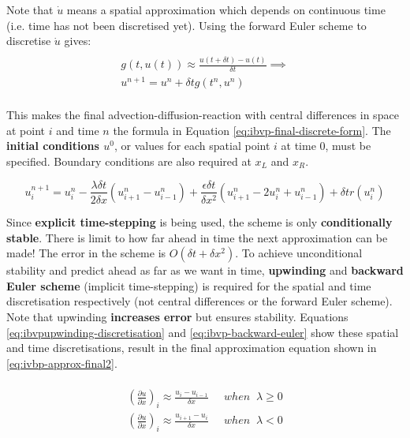 \documentclass{article}
\begin{document}
Note that $\dot{u}$ means a spatial approximation which depends on continuous time (i.e. time has not been discretised yet). Using the forward Euler scheme to discretise $\dot{u}$ gives:
\begin{multline}\\
	g(t, u(t)) \approx \frac{u(t + \delta t) - u(t)}{\delta t} \implies \\
	u^{n+1} = u^n + \delta t g(t^n, u^n) \\
\end{multline}

This makes the final advection-diffusion-reaction with central differences in space at point $i$ and time $n$ the formula in Equation \ref{eq:ibvp-final-discrete-form}. The \textbf{initial conditions $u^0$}, or values for each spatial point $i$ at time $0$, must be specified. Boundary conditions are also required at $x_L$ and $x_R$.

\begin{equation}
	u_i^{n+1} = u_i^n - \frac{\lambda \delta t}{2 \delta x}(u_{i+1}^n - u_{i-1}^n) + \frac{\epsilon \delta t}{\delta x^2}(u_{i+1}^n - 2u_i^n + u_{i-1}^n) + \delta tr(u_i^n)
	\label{eq:ibvp-final-discrete-form}
\end{equation}

Since \textbf{explicit time-stepping} is being used, the scheme is only \textbf{conditionally stable}. There is limit to how far ahead in time the next approximation can be made! The error in the scheme is $O(\delta t + \delta x^2)$. To achieve unconditional stability and predict ahead as far as we want in time, \textbf{upwinding} and \textbf{backward Euler scheme} (implicit time-stepping) is required for the spatial and time discretisation respectively (not central differences or the forward Euler scheme). Note that upwinding \textbf{increases error} but ensures stability. Equations \ref{eq:ibvpupwinding-discretisation} and \ref{eq:ibvp-backward-euler} show these spatial and time discretisations, result in the final approximation equation shown in \ref{eq:ivbp-approx-final2}.

\begin{multline}\\
	{\left( \frac{\partial u}{\partial x} \right)}_i \approx \frac{u_i - u_{i - 1}}{\delta x} \;\;\;\;\; when \;\; \lambda \geq 0 \\
	{\left( \frac{\partial u}{\partial x} \right)}_i \approx \frac{u_{i+1} - u_{i}}{\delta x} \;\;\;\;\; when \;\; \lambda < 0 \\
	\label{eq:ibvpupwinding-discretisation} 
\\ \end{multline}
\end{document}
